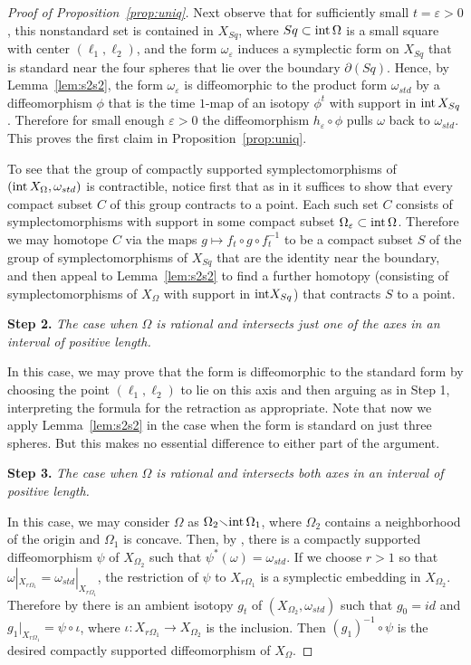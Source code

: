 \documentclass[11pt, reqno]{amsart}
\theoremstyle{remark}
\numberwithin{equation}{subsection}
\numberwithin{figure}{section}
\theoremstyle{customremark}
\newcommand{\intt}{{\rm int}}
\newcommand{\NI}{{\noindent}}
\newcommand{\Om}{{\Omega}}
\newcommand{\om}{{\omega}}
\newcommand{\io}{{\iota}}
\newcommand{\less} {{\smallsetminus}}
\newcommand{\p}{{\partial}}
\newcommand{\MS}{{\medskip}}
\newcommand{\eps}{\varepsilon}
\begin{document}
\begin{proof}[Proof of Proposition~\ref{prop:uniq}]
Next observe that
 for sufficiently small $t=\eps>0$, this nonstandard set     is contained in $X_{Sq}$, where $Sq\subset \intt\, \Om$ is a small 
square  with center $(\ell_1,\ell_2)$, and the form  $\om_\eps$ induces a symplectic form on $X_{Sq}$ that is standard near the four spheres that lie over the boundary  $\p(Sq)$.  
Hence, by Lemma~\ref{lem:s2s2}, the form $\om_\eps$ is diffeomorphic to the product form $\om_{std}$ by a diffeomorphism $\phi$ that is the time $1$-map of an isotopy $\phi^t$ with support in $\intt\,  X_{Sq}$. Therefore for small enough $\eps>0$  the diffeomorphism $h_\eps\circ \phi$  pulls $\om$ back to $\om_{std}$.
This proves the first claim in Proposition~\ref{prop:uniq}.  

To see that the
group of compactly supported symplectomorphisms of $(\intt\,  X_\Om, \om_{std})$
 is  contractible, notice first that as in \cite[Rmk.9.5.5]{JHOL} it suffices to show that every compact subset $C$ of this group contracts to a point. Each such set $C$ consists of symplectomorphisms with support in some compact subset $\Om_\eps\subset \intt\, \Om$.   Therefore we may homotope $C$ via the maps $g\mapsto f_t \circ g\circ f_t^{-1}$  to be a compact subset $S$ of the group of symplectomorphisms of $X_{Sq}$ that are the identity near the boundary, and then appeal to Lemma~\ref{lem:s2s2} to find a further homotopy (consisting of symplectomorphisms of $X_\Om$ with support in $\intt X_{Sq}$) that contracts  $S$ to a point.
\MS

\NI
{\bf Step 2.}  {\it The case when $\Om$ is rational and intersects just one of the axes in an interval of positive length.}


In this case, we
may prove that  the form is diffeomorphic to the standard form by choosing the point $(\ell_1, \ell_2)$ to lie on this axis and then
arguing as 
 in Step 1, interpreting  the formula for the retraction as appropriate.  
 Note that now we apply Lemma~\ref{lem:s2s2}  in the case when the form is standard on just three spheres. 
 But this makes no essential difference to either part of the argument.

 \MS

\NI
{\bf Step 3.} {\it The case when $\Om$ is rational and intersects both axes in an interval of positive length.}

In this case, we may consider  $\Om$ as $\Om_2\less \intt\, \Om_1$, where $\Om_2$ contains a neighborhood of the origin and $\Om_1$ is concave.   Then, by \cite{CG},  there is a compactly supported diffeomorphism $\psi$ of $X_{\Om_2}$ such that $\psi^*(\om) = \om_{std}$. If we choose $r>1$ so that  $\om|_{X_{r\Om_1}} = \om_{std}|_{X_{r\Om_1}}$,  the restriction of $\psi$ to $X_{r\Om_1}$ is a symplectic embedding in $X_{\Om_2}$. Therefore by \cite[Prop.1.5]{CG} there is an ambient isotopy $g_t$ of $(X_{\Om_2}, \om_{std})$ such that $g_0 = id$ and $ g_1|_{X_{r\Om_1}} = \psi\circ \io$, where $\io: X_{r\Om_1}\to X_{\Om_2}$ is the inclusion. 
Then $(g_1)^{-1}\circ \psi$ is the desired compactly supported diffeomorphism of $X_\Om$. 


\end{proof}
\end{document}
